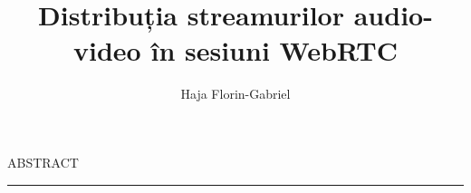 \documentclass[12pt]{report}
\begin{document}
\title{Distribuția streamurilor audio-video în sesiuni WebRTC}					   
\author{Haja Florin-Gabriel}											
				
\maketitle


\newpage
\thispagestyle{empty}
\mbox{}


\newpage
{} 

\cleardoublepage
ABSTRACT
\vspace{0.5cm}	
\hrule
\vspace{0.5cm}	

\end{document}
